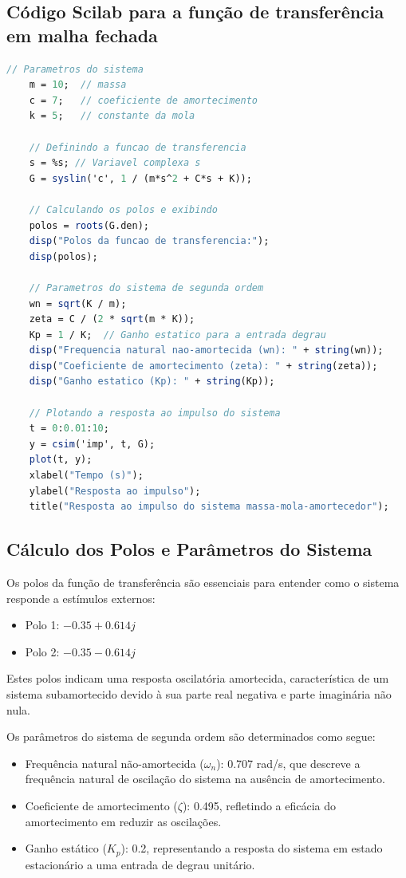 \subsection{Código Scilab para a função de transferência em malha fechada}
\begin{lstlisting}[language=Scilab, caption=Código Scilab para a função de transferência em malha fechada]
    // Parametros do sistema
    m = 10;  // massa
    c = 7;   // coeficiente de amortecimento
    k = 5;   // constante da mola

    // Definindo a funcao de transferencia
    s = %s; // Variavel complexa s
    G = syslin('c', 1 / (m*s^2 + C*s + K));

    // Calculando os polos e exibindo
    polos = roots(G.den);
    disp("Polos da funcao de transferencia:");
    disp(polos);

    // Parametros do sistema de segunda ordem
    wn = sqrt(K / m);
    zeta = C / (2 * sqrt(m * K));
    Kp = 1 / K;  // Ganho estatico para a entrada degrau
    disp("Frequencia natural nao-amortecida (wn): " + string(wn));
    disp("Coeficiente de amortecimento (zeta): " + string(zeta));
    disp("Ganho estatico (Kp): " + string(Kp));

    // Plotando a resposta ao impulso do sistema
    t = 0:0.01:10;
    y = csim('imp', t, G);
    plot(t, y);
    xlabel("Tempo (s)");
    ylabel("Resposta ao impulso");
    title("Resposta ao impulso do sistema massa-mola-amortecedor");
\end{lstlisting}


\subsection{Cálculo dos Polos e Parâmetros do Sistema}
Os polos da função de transferência são essenciais para entender como o sistema responde a estímulos externos:
\begin{itemize}
    \item Polo 1: \( -0.35 + 0.614j \)
    \item Polo 2: \( -0.35 - 0.614j \)
\end{itemize}
Estes polos indicam uma resposta oscilatória amortecida, característica de um sistema subamortecido devido à sua parte real negativa e parte imaginária não nula.

Os parâmetros do sistema de segunda ordem são determinados como segue:
\begin{itemize}
    \item Frequência natural não-amortecida (\( \omega_n \)): 0.707 rad/s, que descreve a frequência natural de oscilação do sistema na ausência de amortecimento.
    \item Coeficiente de amortecimento (\( \zeta \)): 0.495, refletindo a eficácia do amortecimento em reduzir as oscilações.
    \item Ganho estático (\( K_p \)): 0.2, representando a resposta do sistema em estado estacionário a uma entrada de degrau unitário.
\end{itemize}

